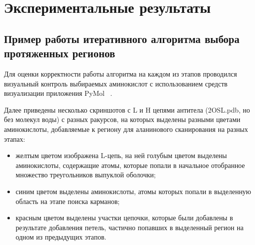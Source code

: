 \graphicspath{{../images/algorithm/}}
\chapter{Экспериментальные результаты}
\section{Пример работы итеративного алгоритма выбора протяженных регионов}
Для оценки корректности работы алгоритма на каждом из этапов проводился визуальный контроль выбираемых аминокислот с использованием средств визуализации приложения PyMol ~\cite{pymol}.

Далее приведены несколько скриншотов с L и H цепями антитела (2OSL.pdb, но без молекул воды) с разных ракурсов, на которых выделены разными цветами аминокислоты, добавляемые к региону для аланинового сканирования на разных этапах:
\begin{itemize}

\item желтым цветом изображена L-цепь, на ней голубым цветом выделены аминокислоты, содержащие атомы, которые попали в начальное отобранное множество треугольников выпуклой оболочки;

\item синим цветом выделены аминокислоты, атомы которых попали в выделенную область на этапе поиска карманов;

\item красным цветом выделены участки цепочки, которые были добавлены в результате добавления петель, частично попавших в выделенный регион на одном из предыдущих этапов.
\end{itemize}



